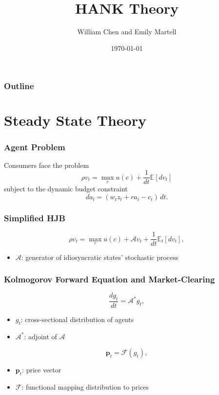 \documentclass{beamer}
\newcommand{\bfp}{\mathbf{p}}
\newcommand{\E}{\mathbb{E}}
\newcommand{\calA}{\mathcal{A}}
\newcommand{\calF}{\mathcal{F}}
\begin{document}
\title{HANK Theory}
\author{William Chen and Emily Martell}
\date{\today}

\begin{frame}
\titlepage
\end{frame}


\begin{frame}
\frametitle{Outline}
\tableofcontents
\end{frame}

\section{Steady State Theory}


\begin{frame}
\frametitle{Agent Problem}
Consumers face the problem
\begin{equation}
\label{eq:hjb}
\rho v_t = \max_c u(c) + \dfrac{1}{dt}\E[dv_t]
\end{equation}
subject to the dynamic budget constraint
\begin{equation}
\label{wealth law of motion}
da_t = \left(w_tz_t + ra_t - c_t\right)\,dt.
\end{equation}
\end{frame}

\begin{frame}
\frametitle{Simplified HJB}
\begin{equation}\label{hjb simplified}
\rho v_t = \max_c u(c) + \calA v_t + \frac{1}{dt}\E_t[dv_t],
\end{equation}
\begin{itemize}
\item $\calA$: generator of idiosyncratic states' stochastic process
\end{itemize}
\end{frame}

\begin{frame}
  \frametitle{Kolmogorov Forward Equation and Market-Clearing}
\begin{equation}  \label{kfe}
\dfrac{dg_t}{dt} = \calA^*g_t,
\end{equation}
\begin{itemize}
\item $g_t$: cross-sectional distribution of agents
\item $\calA^*$: adjoint of $\calA$
\end{itemize}

\begin{equation}\label{market clearing}
\bfp_t = \calF(g_t),
\end{equation}
\begin{itemize}
\item $\bfp_t$: price vector
\item $\calF$: functional mapping distribution to prices
\end{itemize}
\end{frame}
\end{document}
